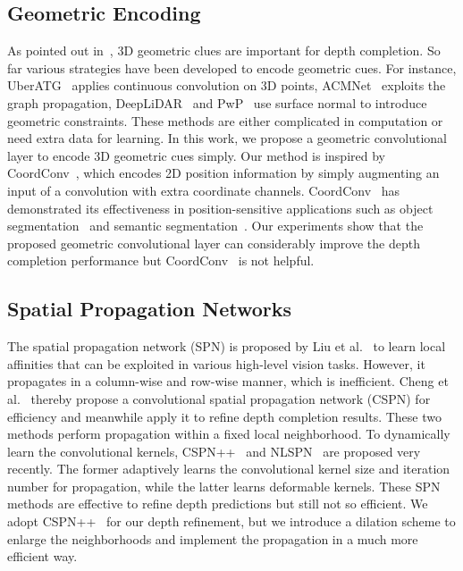 \documentclass[letterpaper, 10 pt, conference]{ieeeconf}
\begin{document}
\subsection{Geometric Encoding}
As pointed out in~\cite{Chen20192d3d}, 3D geometric clues are important for depth completion. So far various strategies have been developed to encode geometric cues. For instance, UberATG~\cite{Chen20192d3d} applies continuous convolution on 3D points, ACMNet~\cite{Zhao2020context} exploits the graph propagation, DeepLiDAR~\cite{Qiu2019deeplidar} and PwP~\cite{Xu2019} use surface normal to introduce geometric constraints. These methods are either complicated in computation or need extra data for learning. In this work, we propose a geometric convolutional layer to encode 3D geometric cues simply. Our method is inspired by CoordConv~\cite{Liu2018Coordconv}, which encodes 2D position information by simply augmenting an input of a convolution with extra coordinate channels. CoordConv~\cite{Liu2018Coordconv} has demonstrated its effectiveness in position-sensitive applications such as object segmentation~\cite{Wang2020SOLO} and semantic segmentation~\cite{Choi2020fly}. Our experiments show that the proposed geometric convolutional layer can considerably improve the depth completion performance but CoordConv~\cite{Liu2018Coordconv} is not helpful.










\subsection{Spatial Propagation Networks}
The spatial propagation network (SPN) is proposed by Liu et al.~\cite{Liu2014SPN} to learn local affinities that can be exploited in various high-level vision tasks. However, it propagates in a column-wise and row-wise manner, which is inefficient. Cheng et al.~\cite{Cheng2018CSPN} thereby propose a convolutional spatial propagation network (CSPN) for efficiency and meanwhile apply it to refine depth completion results. These two methods perform propagation within a fixed local neighborhood. To dynamically learn the convolutional kernels, CSPN++~\cite{Cheng2020CSPN++} and NLSPN~\cite{Park2020NLSPN} are proposed very recently. The former adaptively learns the convolutional kernel size and iteration number for propagation, while the latter learns deformable kernels. These SPN methods are effective to refine depth predictions but still not so efficient. We adopt CSPN++~\cite{Cheng2020CSPN++} for our depth refinement, but we introduce a dilation scheme to enlarge the neighborhoods and implement the propagation in a much more efficient way.     
\end{document}
